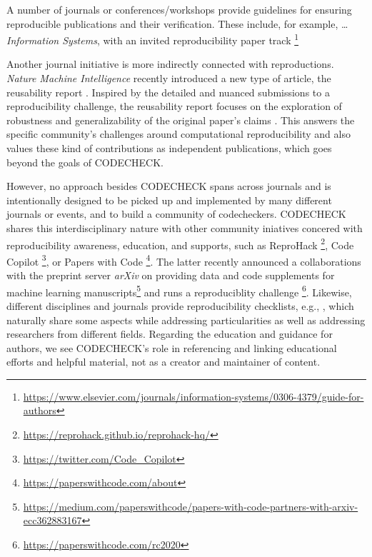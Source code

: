 \documentclass[12pt]{article}
\begin{document}

A number of journals or conferences/workshops provide guidelines for ensuring reproducible publications and their verification.
These include, for example, \ldots{}
\emph{Information Systems}, with an invited reproducibility paper track
\footnote{\url{https://www.elsevier.com/journals/information-systems/0306-4379/guide-for-authors}}

Another journal initiative is more indirectly connected with reproductions.
\emph{Nature Machine Intelligence} recently introduced a new type of article,
the reusability report \cite{noauthor_research_2020}.
Inspired by the detailed and nuanced submissions to a reproducibility 
challenge, the reusability report focuses on the exploration of robustness
and generalizability of the original paper's claims
\cite{noauthor_research_2020}. This answers the specific community's 
challenges around computational reproducibility and also values these kind
of contributions as independent publications, which goes beyond the goals 
of CODECHECK.

However, no approach besides CODECHECK spans across journals and is
intentionally designed to be picked up and implemented by many different 
journals or events, and to build a community of codecheckers. CODECHECK shares
this interdisciplinary nature with other community iniatives concered with 
reproducibility awareness, education, and supports, such as ReproHack
\footnote{\url{https://reprohack.github.io/reprohack-hq/}}, Code Copilot
\footnote{\url{https://twitter.com/Code_Copilot}}, or Papers with Code
\footnote{\url{https://paperswithcode.com/about}}.
The latter recently announced a collaborations with the preprint server
\emph{arXiv} on providing data and code supplements for machine learning
manuscripts\footnote{\url{https://medium.com/paperswithcode/papers-with-code-partners-with-arxiv-ecc362883167}} and runs a reproduciblity challenge
\footnote{\url{https://paperswithcode.com/rc2020}}.
Likewise, different disciplines and journals provide reproducibility
checklists, e.g., \cite{rosenberg_next_2020}, which naturally share some
aspects while addressing particularities as well as addressing researchers
from different fields. Regarding the education and guidance for authors, 
we see CODECHECK's role in referencing and linking educational efforts
and helpful material, not as a creator and maintainer of content.
\end{document}
